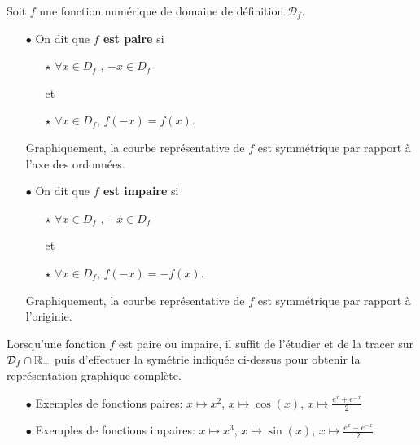 \documentclass[a4paper, 11pt]{article}
\begin{document}
\begin{defi}
Soit $f$ une fonction num\'erique de domaine de d\'efinition $\mathcal{D}_f$.
\begin{itemize}
 \item[$\bullet$]
On dit que \textbf{$f$ est paire} si
\begin{itemize}
\item[$\star$] $\forall x \in D_f$ , $-x\in D_f$ 

et 

\item[$\star$] $\forall x \in D_f$, $f(-x)=f(x)$.
\end{itemize} 
Graphiquement, la courbe repr\'esentative de $f$ est symmétrique par rapport à l'axe des ordonnées. 
\item[$\bullet$] On dit que \textbf{$f$ est impaire} si
\begin{itemize}
\item[$\star$] $\forall x \in D_f$ , $-x\in D_f$ 

et 

\item[$\star$] $\forall x \in D_f$, $f(-x)=-f(x)$.
\end{itemize}   
Graphiquement, la courbe repr\'esentative de $f$ est symmétrique par rapport à l'originie. 
\end{itemize}
\end{defi}


\begin{rem}
Lorsqu'une fonction $f$ est paire ou impaire, il suffit de l'\'etudier et de la tracer sur $\mathcal{D}_f\cap\mathbb{R}_+$
puis d'effectuer la sym\'etrie indiqu\'ee ci-dessus pour obtenir la repr\'esentation graphique compl\`{e}te.
\end{rem}

\begin{exemples} 
\begin{itemize}
\item[$\bullet$] Exemples de fonctions paires: $x\mapsto x^2$, $x\mapsto \cos(x)$, $x\mapsto \frac{e^{x}+e^{-x}}{2}$
\item[$\bullet$] Exemples de fonctions impaires: $x\mapsto x^3$, $x\mapsto \sin(x)$, $x\mapsto \frac{e^{x}-e^{-x}}{2}$
\end{itemize}
\end{exemples}

\vspace{0.2cm}
\end{document}
